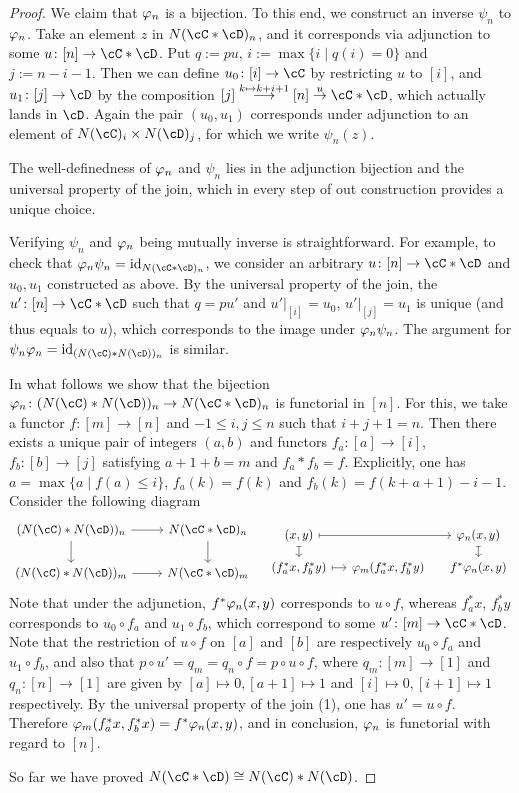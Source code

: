 \documentclass[a4paper,11pt,openany]{scrartcl}
\begin{document}
\begin{proof}
We claim that $\varphi_n$ is a bijection. To this end, we construct an inverse $\psi_n$ to $\varphi_n$. Take an element $z$ in $N(\cC*\cD)_n$, and it corresponds via adjunction to some $u\colon[n]\to\cC*\cD$. Put $q:=pu$, $i:=\max\{i\mid q(i)=0\}$ and $j:=n-i-1$. Then we can define $u_0\colon[i]\to \cC$ by restricting $u$ to $[i]$, and $u_1\colon[j]\to\cD$ by the composition $[j]\overset{k\mapsto k+i+1}{\longrightarrow}[n]\overset{u}{\to}\cC*\cD$, which actually lands in $\cD$. Again the pair $(u_0,u_1)$ corresponds under adjunction to an element of $N(\cC)_i\times N(\cD)_j$, for which we write $\psi_n(z)$. 

The well-definedness of $\varphi_n$ and $\psi_n$ lies in the adjunction bijection and the universal property of the join, which in every step of out construction provides a unique choice. 

Verifying $\psi_n$ and $\varphi_n$ being mutually inverse is straightforward. For example, to check that $\f_n\psi_n=\id_{N(\cC*\cD)_n}$, we consider an arbitrary $u\colon[n]\to\cC*\cD$ and $u_0,u_1$ constructed as above. By the universal property of the join, the $u'\colon[n]\to\cC*\cD$ such that $q=pu'$ and $u'|_{[i]}=u_0$, $u'|_{[j]}=u_1$ is unique (and thus equals to $u$), which corresponds to the image under $\varphi_n\psi_n$. The argument for $\psi_n\f_n=\id_{(N(\cC)*N(\cD))_n}$ is similar.

In what follows we show that the bijection $\f_n\colon (N(\cC)*N(\cD))_n\to N(\cC*\cD)_n$ is functorial in $[n]$. For this, we take a functor $f\colon[m]\to[n]$ and $-1\leqslant i,j\leqslant n$ such that $i+j+1=n$. Then there exists a unique pair of integers $(a,b)$  and functors $f_a\colon[a]\to[i]$, $f_b\colon[b]\to[j]$ satisfying $a+1+b=m$ and $f_a*f_b=f$. Explicitly, one has $a=\max\{a\mid f(a)\leqslant i\}$, $f_a(k)=f(k)$ and $f_b(k)=f(k+a+1)-i-1$. Consider the following diagram
\[
\begin{tikzcd}
(N(\cC)*N(\cD))_n\arrow[r]\arrow[d]& N(\cC*\cD)_n\arrow[d]\\
(N(\cC)*N(\cD))_m\arrow[r]& N(\cC*\cD)_m
\end{tikzcd}
\quad
\begin{tikzcd}[sep=small]
(x,y)\arrow[rr,mapsto]\arrow[d,mapsto]&& \f_n(x,y)\arrow[d,mapsto]\\
(f^*_ax,f^*_by)\arrow[r,mapsto]& \f_m(f^*_ax,f^*_by)& f^*\f_n(x,y)
\end{tikzcd}
\]
Note that under the adjunction, $f^*\varphi_n(x,y)$ corresponds to $u\circ f$, whereas $f^*_ax$, $f^*_by$ corresponds to $u_0\circ f_a$ and $u_1\circ f_b$, which correspond to some $u'\colon[m]\to\cC*\cD$. Note that the restriction of $u\circ f$ on $[a]$ and $[b]$ are respectively $u_0\circ f_a$ and $u_1\circ f_b$, and also that $p\circ u'=q_m=q_n\circ f=p\circ u\circ f$, where $q_m\colon[m]\to[1]$ and $q_n\colon[n]\to[1]$ are given by $[a]\mapsto0,[a+1]\mapsto1$ and $[i]\mapsto0,[i+1]\mapsto1$ respectively. By the universal property of the join (1), one has $u'=u\circ f$. Therefore $\varphi_m(f^*_ax,f^*_bx)=f^*\varphi_n(x,y)$, and in conclusion, $\varphi_n$ is functorial with regard to $[n]$.

So far we have proved $N(\cC*\cD)\cong N(\cC)* N(\cD)$.
\end{proof}
\end{document}
